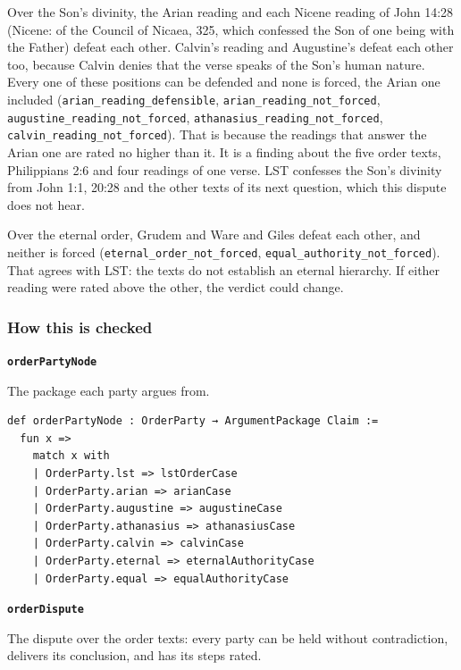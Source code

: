 \documentclass[11pt,paper=\testimonypaper,DIV=13,parskip=false]{scrartcl}
\begin{document}
Over the Son’s divinity, the Arian reading and each Nicene reading of John 14:28 (Nicene: of the Council of Nicaea, 325, which confessed the Son of one being with the Father) defeat each other. Calvin’s reading and Augustine’s defeat each other too, because Calvin denies that the verse speaks of the Son’s human nature. Every one of these positions can be defended and none is forced, the Arian one included (\texttt{arian\_\allowbreak{}reading\_\allowbreak{}defensible}, \texttt{arian\_\allowbreak{}reading\_\allowbreak{}not\_\allowbreak{}forced}, \texttt{augustine\_\allowbreak{}reading\_\allowbreak{}not\_\allowbreak{}forced}, \texttt{athanasius\_\allowbreak{}reading\_\allowbreak{}not\_\allowbreak{}forced}, \texttt{calvin\_\allowbreak{}reading\_\allowbreak{}not\_\allowbreak{}forced}). That is because the readings that answer the Arian one are rated no higher than it. It is a finding about the five order texts, Philippians 2:6 and four readings of one verse. LST confesses the Son’s divinity from John 1:1, 20:28 and the other texts of its next question, which this dispute does not hear.

Over the eternal order, Grudem and Ware and Giles defeat each other, and neither is forced (\texttt{eternal\_\allowbreak{}order\_\allowbreak{}not\_\allowbreak{}forced}, \texttt{equal\_\allowbreak{}authority\_\allowbreak{}not\_\allowbreak{}forced}). That agrees with LST: the texts do not establish an eternal hierarchy. If either reading were rated above the other, the verdict could change.

\subsubsection*{How this is checked}
\par\medskip\noindent\textbf{\texttt{order\allowbreak{}Party\allowbreak{}Node}}\par\nobreak\noindent
The package each party argues from.

{\small\begin{verbatim}
def orderPartyNode : OrderParty → ArgumentPackage Claim :=
  fun x =>
    match x with
    | OrderParty.lst => lstOrderCase
    | OrderParty.arian => arianCase
    | OrderParty.augustine => augustineCase
    | OrderParty.athanasius => athanasiusCase
    | OrderParty.calvin => calvinCase
    | OrderParty.eternal => eternalAuthorityCase
    | OrderParty.equal => equalAuthorityCase
\end{verbatim}}
\par\medskip\noindent\textbf{\texttt{order\allowbreak{}Dispute}}\par\nobreak\noindent
The dispute over the order texts: every party can be held without contradiction, delivers its conclusion, and has its steps rated.
\end{document}
